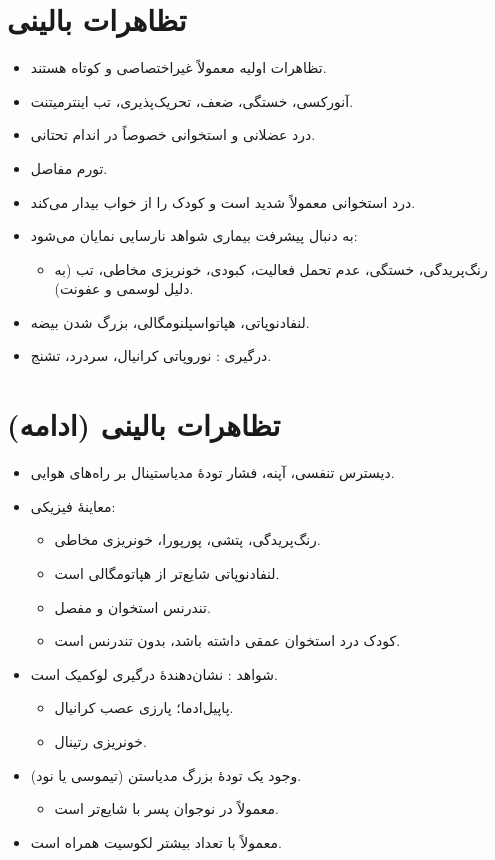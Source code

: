 \documentclass[12pt,a4paper]{article}
\begin{document}
\section*{تظاهرات بالینی}
\begin{itemize}
\item تظاهرات اولیه معمولاً غیراختصاصی و کوتاه هستند.
\item آنورکسی، خستگی، ضعف، تحریک‌پذیری، تب  اینترمیتنت.
\item درد عضلانی و استخوانی خصوصاً در اندام تحتانی.
\item تورم مفاصل.
\item درد استخوانی معمولاً شدید است و کودک را از خواب بیدار می‌کند.
\item به دنبال پیشرفت بیماری شواهد نارسایی  نمایان می‌شود:
\begin{itemize}
\item رنگ‌پریدگی، خستگی، عدم تحمل فعالیت، کبودی، خونریزی مخاطی، تب (به دلیل لوسمی و عفونت).
\end{itemize}
\item لنفادنوپاتی، هپاتواسپلنومگالی، بزرگ شدن بیضه.
\item درگیری : نوروپاتی کرانیال، سردرد، تشنج.
\end{itemize}

\section*{تظاهرات بالینی (ادامه)}
\begin{itemize}
\item دیسترس تنفسی، آپنه، فشار تودهٔ مدیاستینال بر راه‌های هوایی.
\item معاینهٔ فیزیکی:
\begin{itemize}
\item رنگ‌پریدگی، پتشی، پورپورا، خونریزی مخاطی.
\item لنفادنوپاتی شایع‌تر از هپاتومگالی است.
\item تندرنس استخوان و مفصل.
\item کودک درد استخوان عمقی داشته باشد، بدون تندرنس است.
\end{itemize}
\item شواهد : نشان‌دهندهٔ درگیری لوکمیک  است.
\begin{itemize}
\item پاپیل‌ادما؛ پارزی عصب کرانیال.
\item خونریزی رتینال.
\end{itemize}
\item وجود یک تودهٔ بزرگ مدیاستن (تیموسی یا نود).
\begin{itemize}
\item معمولاً در نوجوان پسر با  شایع‌تر است.
\end{itemize}
\item {} معمولاً با تعداد بیشتر لکوسیت همراه است.
\end{itemize}
\end{document}
